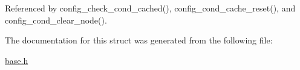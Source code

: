 Referenced by config\-\_\-check\-\_\-cond\-\_\-cached(), config\-\_\-cond\-\_\-cache\-\_\-reset(), and config\-\_\-cond\-\_\-clear\-\_\-node().



The documentation for this struct was generated from the following file\-:\begin{DoxyCompactItemize}
\item 
\hyperlink{base_8h}{base.\-h}\end{DoxyCompactItemize}

